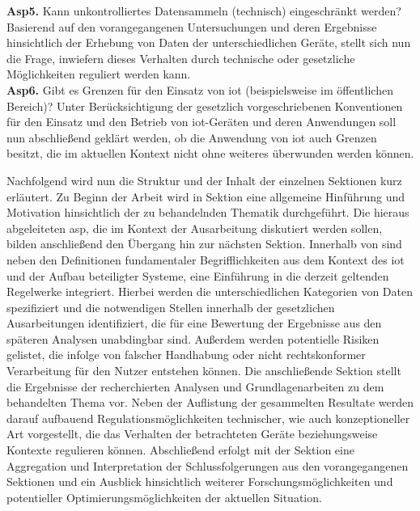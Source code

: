 \textbf{Asp5.} Kann unkontrolliertes Datensammeln (technisch) eingeschränkt werden? Basierend auf den vorangegangenen Untersuchungen und deren Ergebnisse hinsichtlich der Erhebung von Daten der unterschiedlichen Geräte, stellt sich nun die Frage, inwiefern dieses Verhalten durch technische oder gesetzliche Möglichkeiten reguliert werden kann.\\
\textbf{Asp6.} Gibt es Grenzen für den Einsatz von \ac{iot} (beispielsweise im öffentlichen Bereich)? Unter Berücksichtigung der gesetzlich vorgeschriebenen Konventionen für den Einsatz und den Betrieb von \ac{iot}-Geräten und deren Anwendungen soll nun abschließend geklärt werden, ob die Anwendung von \ac{iot} auch Grenzen besitzt, die im aktuellen Kontext nicht ohne weiteres überwunden werden können.


\noindent Nachfolgend wird nun die Struktur und der Inhalt der einzelnen Sektionen kurz erläutert. 
Zu Beginn der Arbeit wird in Sektion  eine allgemeine Hinführung und Motivation hinsichtlich der zu behandelnden Thematik durchgeführt. Die hieraus abgeleiteten \ac{asp}, die im Kontext der Ausarbeitung diskutiert werden sollen, bilden anschließend den Übergang hin zur nächsten Sektion. 
Innerhalb von  sind neben den Definitionen fundamentaler Begrifflichkeiten aus dem Kontext des \ac{iot} und der Aufbau beteiligter Systeme, eine Einführung in die derzeit geltenden Regelwerke integriert. 
Hierbei werden die unterschiedlichen Kategorien von Daten spezifiziert und die notwendigen Stellen innerhalb der gesetzlichen Ausarbeitungen identifiziert, die für eine Bewertung der Ergebnisse aus den späteren Analysen unabdingbar sind. 
Außerdem werden potentielle Risiken gelistet, die infolge von falscher Handhabung oder nicht rechtskonformer Verarbeitung für den Nutzer entstehen können. Die anschließende Sektion  stellt die Ergebnisse der recherchierten Analysen und Grundlagenarbeiten zu dem behandelten Thema vor. 
Neben der Auflistung der gesammelten Resultate werden darauf aufbauend Regulationsmöglichkeiten technischer, wie auch konzeptioneller Art vorgestellt, die das Verhalten der betrachteten Geräte beziehungsweise Kontexte regulieren können. 
Abschließend erfolgt mit der Sektion  eine Aggregation und Interpretation der Schlussfolgerungen aus den vorangegangenen Sektionen und ein Ausblick hinsichtlich weiterer Forschungsmöglichkeiten und potentieller Optimierungsmöglichkeiten der aktuellen Situation. 

